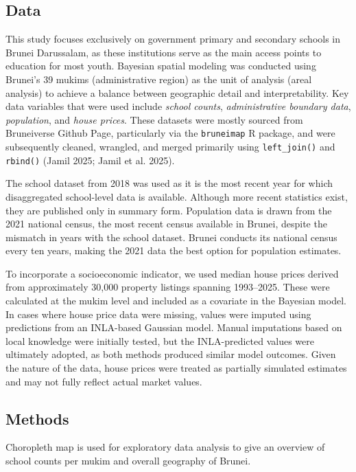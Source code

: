 \documentclass[
  12pt,
]{article}
\begin{document}
\subsection{Data}\label{data}

This study focuses exclusively on government primary and secondary
schools in Brunei Darussalam, as these institutions serve as the main
access points to education for most youth. Bayesian spatial modeling was
conducted using Brunei's 39 mukims (administrative region) as the unit
of analysis (areal analysis) to achieve a balance between geographic
detail and interpretability. Key data variables that were used include
\emph{school counts}, \emph{administrative boundary data},
\emph{population}, and \emph{house prices}. These datasets were mostly
sourced from Bruneiverse Github Page, particularly via the
\texttt{bruneimap} R package, and were subsequently cleaned, wrangled,
and merged primarily using \texttt{left\_join()} and \texttt{rbind()}
(Jamil 2025; Jamil et al. 2025).

The school dataset from 2018 was used as it is the most recent year for
which disaggregated school-level data is available. Although more recent
statistics exist, they are published only in summary form. Population
data is drawn from the 2021 national census, the most recent census
available in Brunei, despite the mismatch in years with the school
dataset. Brunei conducts its national census every ten years, making the
2021 data the best option for population estimates.

To incorporate a socioeconomic indicator, we used median house prices
derived from approximately 30,000 property listings spanning 1993--2025.
These were calculated at the mukim level and included as a covariate in
the Bayesian model. In cases where house price data were missing, values
were imputed using predictions from an INLA-based Gaussian model. Manual
imputations based on local knowledge were initially tested, but the
INLA-predicted values were ultimately adopted, as both methods produced
similar model outcomes. Given the nature of the data, house prices were
treated as partially simulated estimates and may not fully reflect
actual market values.

\subsection{Methods}\label{sec-method}

Choropleth map is used for exploratory data analysis to give an overview
of school counts per mukim and overall geography of Brunei.
\end{document}
